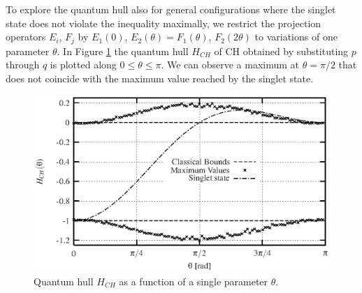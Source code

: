 To explore the quantum hull also for general configurations where
the singlet state does not violate the inequality maximally,
we restrict the projection operators $E_i,\,F_j$ by
${E}_1(0)$, ${E}_2(\theta)={F}_1(\theta)$, ${F}_2(2\theta)$ to variations of one parameter
$\theta$.
In Figure  \ref{f-2003-qpoly-3} the quantum hull  $H_{CH}$ of CH
obtained by substituting $p$ through $q$ is plotted
along $0 \le \theta \le \pi$. We can observe a maximum at
$\theta=\pi/2$ that does not coincide with the maximum value reached
by the singlet state.
\begin{figure}
  \centering
  \includegraphics[clip]{2003-qpoly-plotch}
  \caption{Quantum hull $H_{CH}$
as a function of a single parameter $\theta$.}
  \label{f-2003-qpoly-3}
\end{figure}

